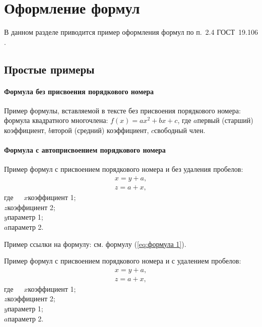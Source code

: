 \newpage\section{Оформление формул}

В данном разделе приводится пример оформления формул по п.~2.4 ГОСТ~19.106 \cite{gost19106}.

\subsection{Простые примеры}

\paragraph{Формула без присвоения порядкового номера}

Пример формулы, вставляемой в тексте без присвоения порядкового номера: формула квадратного многочлена: $f(x) = ax^2 + bx + c$, где $a$\mdash первый (старший) коэффициент, $b$\mdash второй (средний) коэффициент, $c$\mdash свободный член.

\paragraph{Формула с автоприсвоением порядкового номера}
Пример формул с присвоением порядкового номера и без удаления пробелов:
\begin{align}
	x = y+a, \label{eq:формула 1}\\
	z = a+x, \label{eq:формула 2}
\end{align}
\noindent где~~~$x$\ndash коэффициент 1; \\
\indent $z$\ndash коэффициент 2;\\
\indent $y$\ndash параметр 1;\\
\indent $a$\ndash параметр 2.

Пример ссылки на формулу: см. формулу (\ref{eq:формула 1}).

Пример формул с присвоением порядкового номера и с удалением пробелов:
{\zerodisplayskips
	\begin{align}
	x = y+a, \label{eq:формула 3}\\
	z = a+x, \label{eq:формула 4}
	\end{align}
}%
\noindent где~~~$x$\ndash коэффициент 1; \\
\indent $z$\ndash коэффициент 2;\\
\indent $y$\ndash параметр 1;\\
\indent $a$\ndash параметр 2.

